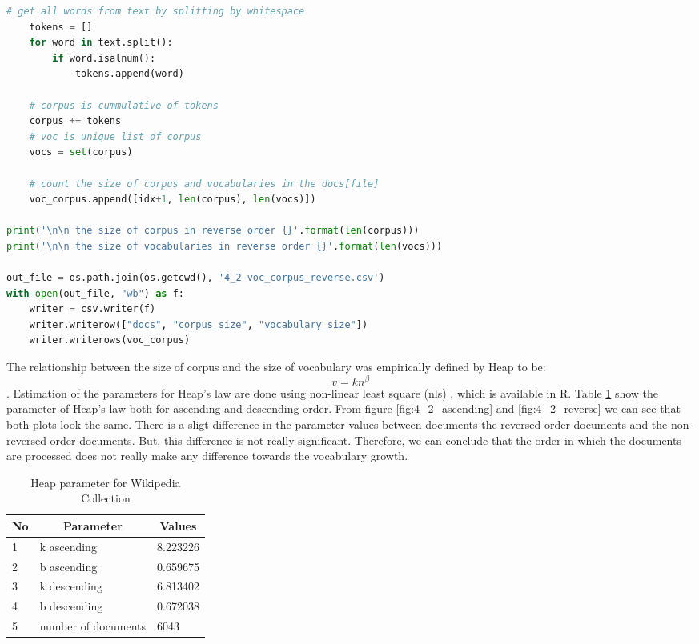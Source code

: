\documentclass[letterpaper,11pt]{article}
\begin{document}
\begin{lstlisting}[language=python, caption={Source code for calculating vocabulary growth}, label={lst:vocab-growth}]
    # get all words from text by splitting by whitespace
    tokens = []
    for word in text.split():
        if word.isalnum():
            tokens.append(word)

    # corpus is cummulative of tokens
    corpus += tokens
    # voc is unique list of corpus
    vocs = set(corpus)

    # count the size of corpus and vocabularies in the docs[file]
    voc_corpus.append([idx+1, len(corpus), len(vocs)])

print('\n\n the size of corpus in reverse order {}'.format(len(corpus)))
print('\n\n the size of vocabularies in reverse order {}'.format(len(vocs)))

out_file = os.path.join(os.getcwd(), '4_2-voc_corpus_reverse.csv')
with open(out_file, "wb") as f:
    writer = csv.writer(f)
    writer.writerow(["docs", "corpus_size", "vocabulary_size"])
    writer.writerows(voc_corpus)

\end{lstlisting}

The relationship between the size of corpus and the size of vocabulary was empirically defined by Heap \cite{Croft:2009:SEI:1516224} to be: \[ v = kn^\beta \].
Estimation of the parameters for Heap's law are done using non-linear least square (nls) \cite{nls}, which is available in R. Table \ref{tab:heap-par} show the parameter of Heap's law both for ascending and descending order. 
From figure \ref{fig:4_2_ascending} and \ref{fig:4_2_reverse} we can see that both plots look the same. There is a sligt difference in the parameter values between documents the reversed-order documents and the non-reversed-order documents. But, this difference is not really significant. Therefore, we can conclude that the order in which the documents are processed does not really make any difference towards the vocabulary growth. 

\begin{table}[H]
\centering
\begin{tabular}{|l|l|l|}
\hline
\multicolumn{1}{|c|}{\textbf{No}} & \multicolumn{1}{c|}{\textbf{Parameter}} & \multicolumn{1}{c|}{\textbf{Values}} \\ \hline
1 & k ascending & 8.223226 \\ \hline
2 & b ascending & 0.659675 \\ \hline
3 & k descending & 6.813402 \\ \hline
4 & b descending & 0.672038 \\ \hline
5 & number of documents & 6043 \\ \hline
\end{tabular}
\caption{Heap parameter for Wikipedia Collection}
\label{tab:heap-par}
\end{table}
\end{document}
